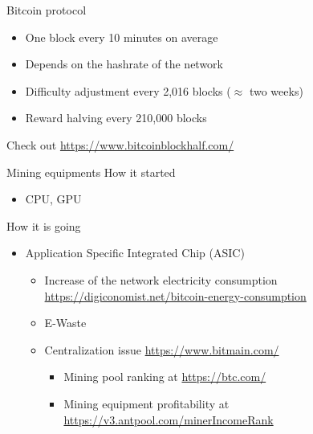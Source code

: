 \documentclass{beamer}
\begin{document}
\begin{frame}{Bitcoin protocol}
\begin{itemize}
  \item One block every 10 minutes on average
  \item Depends on the hashrate of the network
  \item Difficulty adjustment every 2,016 blocks ($\approx$ two weeks)
  \item Reward halving every 210,000 blocks
\end{itemize}
Check out \url{https://www.bitcoinblockhalf.com/}
\end{frame}
\begin{frame}{Mining equipments}
How it started
\begin{itemize}
  \item CPU, GPU
\end{itemize}
How it is going
\begin{itemize}
  \item Application Specific Integrated Chip (ASIC)
  \begin{itemize}
  \item Increase of the network electricity consumption \url{https://digiconomist.net/bitcoin-energy-consumption}
  \item E-Waste
  \item Centralization issue \url{https://www.bitmain.com/}
  \begin{itemize}
    \item Mining pool ranking at \url{https://btc.com/}
    \item Mining equipment profitability at \url{https://v3.antpool.com/minerIncomeRank}
  \end{itemize}
  \end{itemize}
\end{itemize}
\end{frame}
\end{document}
